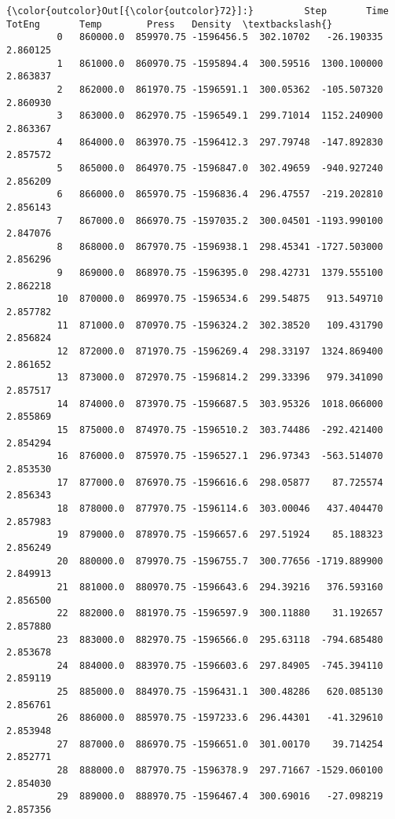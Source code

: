 \documentclass[11pt]{article}
\begin{document}
\begin{Verbatim}[commandchars=\\\{\}]
{\color{outcolor}Out[{\color{outcolor}72}]:}         Step       Time     TotEng       Temp        Press   Density  \textbackslash{}
         0   860000.0  859970.75 -1596456.5  302.10702   -26.190335  2.860125   
         1   861000.0  860970.75 -1595894.4  300.59516  1300.100000  2.863837   
         2   862000.0  861970.75 -1596591.1  300.05362  -105.507320  2.860930   
         3   863000.0  862970.75 -1596549.1  299.71014  1152.240900  2.863367   
         4   864000.0  863970.75 -1596412.3  297.79748  -147.892830  2.857572   
         5   865000.0  864970.75 -1596847.0  302.49659  -940.927240  2.856209   
         6   866000.0  865970.75 -1596836.4  296.47557  -219.202810  2.856143   
         7   867000.0  866970.75 -1597035.2  300.04501 -1193.990100  2.847076   
         8   868000.0  867970.75 -1596938.1  298.45341 -1727.503000  2.856296   
         9   869000.0  868970.75 -1596395.0  298.42731  1379.555100  2.862218   
         10  870000.0  869970.75 -1596534.6  299.54875   913.549710  2.857782   
         11  871000.0  870970.75 -1596324.2  302.38520   109.431790  2.856824   
         12  872000.0  871970.75 -1596269.4  298.33197  1324.869400  2.861652   
         13  873000.0  872970.75 -1596814.2  299.33396   979.341090  2.857517   
         14  874000.0  873970.75 -1596687.5  303.95326  1018.066000  2.855869   
         15  875000.0  874970.75 -1596510.2  303.74486  -292.421400  2.854294   
         16  876000.0  875970.75 -1596527.1  296.97343  -563.514070  2.853530   
         17  877000.0  876970.75 -1596616.6  298.05877    87.725574  2.856343   
         18  878000.0  877970.75 -1596114.6  303.00046   437.404470  2.857983   
         19  879000.0  878970.75 -1596657.6  297.51924    85.188323  2.856249   
         20  880000.0  879970.75 -1596755.7  300.77656 -1719.889900  2.849913   
         21  881000.0  880970.75 -1596643.6  294.39216   376.593160  2.856500   
         22  882000.0  881970.75 -1596597.9  300.11880    31.192657  2.857880   
         23  883000.0  882970.75 -1596566.0  295.63118  -794.685480  2.853678   
         24  884000.0  883970.75 -1596603.6  297.84905  -745.394110  2.859119   
         25  885000.0  884970.75 -1596431.1  300.48286   620.085130  2.856761   
         26  886000.0  885970.75 -1597233.6  296.44301   -41.329610  2.853948   
         27  887000.0  886970.75 -1596651.0  301.00170    39.714254  2.852771   
         28  888000.0  887970.75 -1596378.9  297.71667 -1529.060100  2.854030   
         29  889000.0  888970.75 -1596467.4  300.69016   -27.098219  2.857356   

\end{Verbatim}
\end{document}
